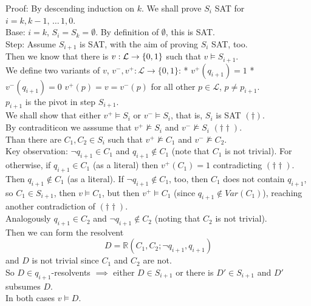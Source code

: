 







Proof: By descending induction on $k$. We shall prove $S_i$ SAT for $i = k, k-1, \, \dots \, 1 , 0$.\\

Base: $i=k$, $S_i = S_k = \emptyset$. By definition of $\emptyset$, this is SAT.\\

Step: Assume $S_{i+1}$ is SAT, with the aim of proving $S_i$ SAT, too.\\
Then we know that there is $v: \mathcal{L} \rightarrow \{0,1\}$ such that $v \models S_{i+1}$.\\
We define two variants of $v$, $v^-,v^+: \mathcal{L} \rightarrow \{0,1\}$:
* $v^+ (q_{i+1}) = 1$
* $v^- (q_{i+1}) = 0$
$v^+ (p) = v = v^- (p)$ for all other $p \in \mathcal{L}$, $p \neq p_{i+1}$.\\
$p_{i+1}$ is the pivot in step $S_{i+1}$.\\

We shall show that either $v^+ \models S_i$ or $v^- \models S_i$, that is, $S_i$ is SAT $(\dag)$.\\

By contraditicon we asssume that $v^+ \not \models S_i$ and $v^- \not \models S_i$ $(\dag \dag)$.\\

Than there are $C_1, C_2 \in S_i$ such that $v^+ \not \models C_1$ and $v^- \not \models C_2$.\\

Key observation: $\neg q_{i+1} \in C_1$ and $q_{i+1} \notin C_1$ (note that $C_1$ is not trivial). For otherwise, if $q_{i+1} \in C_1$ (as a literal) then $v^+(C_1) = 1$ contradicting $(\dag \dag)$.\\
Then $q_{i+1} \notin C_1$ (as a literal). If $\neg q_{i+1} \notin C_1$, too, then $C_1$ does not contain $q_{i+1}$, so $C_1 \in S_{i+1}$, then $v \models C_1$, but then $v^+ \models C_1$ (since $q_{i+1} \notin Var (C_1)$), reaching another contradiction of $(\dag \dag)$.\\

Analogously $q_{i+1} \in C_2$ and $\neg q_{i+1} \notin C_2$ (noting that $C_2$ is not trivial).\\

Then we can form the resolvent
$$ D = \mathbb{R} (C_1, C_2; \neg q_{i+1}, q_{i+1}) $$
and $D$ is not trivial since $C_1$ and $C_2$ are not.\\
So $D \in q_{i+1}$-resolvents $\implies$ either $D \in S_{i+1}$ or there is $D' \in S_{i+1}$ and $D'$ subsumes $D$.\\
In both cases $v \models D$.\\

